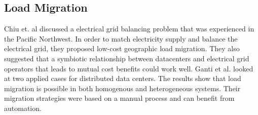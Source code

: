 \subsection{Load Migration}
Chiu et. al \cite{chiu_electric_2012} discussed a electrical grid balancing problem that was experienced in the Pacific Northwest. In order to match electricity supply and balance the electrical grid, they proposed low-cost geographic load migration. They also suggested that a symbiotic relationship between datacenters and electrical grid operators that leads to mutual cost benefits could work well.  Ganti et al. \cite{Ghatikar2012b} looked at two applied cases for distributed data centers. The results show that load migration is possible in both homogenous and heterogeneous systems. Their migration strategies were based on a manual process and can benefit from automation.
